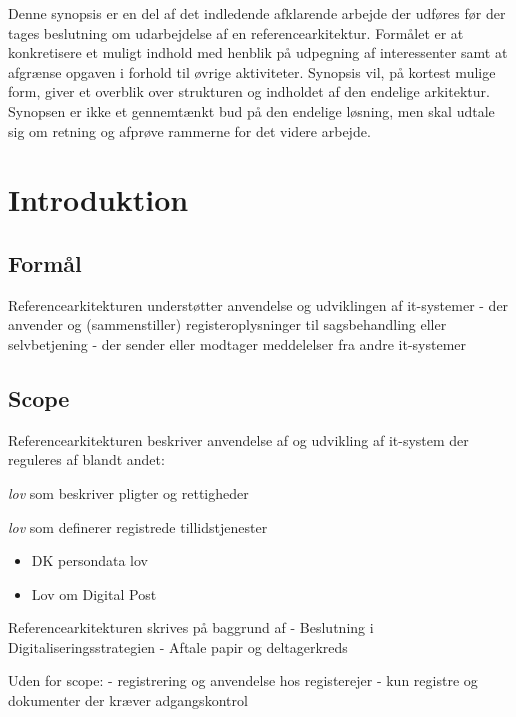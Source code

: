 Denne synopsis er en del af det indledende afklarende arbejde der
udføres før der tages beslutning om udarbejdelse af en
referencearkitektur. Formålet er at konkretisere et muligt indhold med
henblik på udpegning af interessenter samt at afgrænse opgaven i forhold
til øvrige aktiviteter. Synopsis vil, på kortest mulige form, giver et
overblik over strukturen og indholdet af den endelige arkitektur.
Synopsen er ikke et gennemtænkt bud på den endelige løsning, men skal
udtale sig om retning og afprøve rammerne for det videre arbejde.

\section{Introduktion}\label{introduktion}

\subsection{Formål}\label{formuxe5l}

Referencearkitekturen understøtter anvendelse og udviklingen af
it-systemer - der anvender og (sammenstiller) registeroplysninger til
sagsbehandling eller selvbetjening - der sender eller modtager
meddelelser fra andre it-systemer

\subsection{Scope}\label{scope}

Referencearkitekturen beskriver anvendelse af og udvikling af it-system
der reguleres af blandt andet:

\begin{description}
\tightlist
\item[EU databeskyttelse]
\emph{lov} som beskriver pligter og rettigheder
\item[EU eIDAS]
\emph{lov} som definerer registrede tillidstjenester
\end{description}

\begin{itemize}
\tightlist
\item
  DK persondata lov
\item
  Lov om Digital Post
\end{itemize}

Referencearkitekturen skrives på baggrund af - Beslutning i
Digitaliseringsstrategien - Aftale papir og deltagerkreds

Uden for scope: - registrering og anvendelse hos registerejer - kun
registre og dokumenter der kræver adgangskontrol

